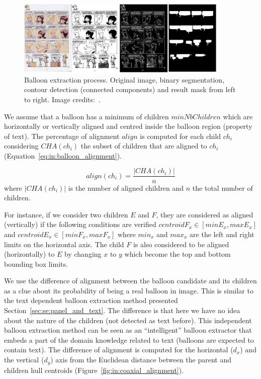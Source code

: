  \begin{figure}[!ht]  %
   \centering
  \includegraphics[width=0.9\textwidth]{closed_balloon_process.png}
  \caption[Balloon extraction process]{Balloon extraction process. Original image, binary segmentation, contour detection (connected components) and result mask from left to right. Image credits:~\cite{Midam01}.}
  \label{fig:in:balloon_binarisation}
 \end{figure}

We assume that a balloon has a minimum of children $minNbChildren$ which are horizontally or vertically aligned and centred inside the balloon region (property of text).
The percentage of alignment $align$ is computed for each child $ch_i$ considering $CHA(ch_i)$ the subset of children that are aligned to $ch_i$ (Equation~\ref{eq:in:balloon_alignment}).

\begin{equation}
	\label{eq:in:balloon_alignment}
	align(ch_i) = \frac{|CHA(ch_i)|}{n}
\end{equation}
where $|CHA(ch_i)|$ is the number of aligned children and $n$ the total number of children.


For instance, if we consider two children $E$ and $F$, they are considered as aligned (vertically) if the following conditions are verified $centroidF_x \in [minE_x, maxE_x]$ and $centroidE_x \in [minF_x, maxF_x]$ where $min_x$ and $max_x$ are the left and right limits on the horizontal axis.
The child $F$ is also considered to be aligned (horizontally) to $E$ by changing $x$ to $y$ which become the top and bottom bounding box limits.

We use the difference of alignment between the balloon candidate and its children as a clue about its probability of being a real balloon in image.
This is similar to the text dependent balloon extraction method presented Section~\ref{sec:se:panel_and_text}.
The difference is that here we have no idea about the nature of the children (not detected as text before).
This independent balloon extraction method can be seen as an ``intelligent'' balloon extractor that embeds a part of the domain knowledge related to text (balloons are expected to contain text).
The difference of alignment is computed for the horizontal ($d_x$) and the vertical ($d_y$) axis from the Euclidean distance between the parent and children hull centroids (Figure~\ref{fig:in:coaxial_alignment}).


